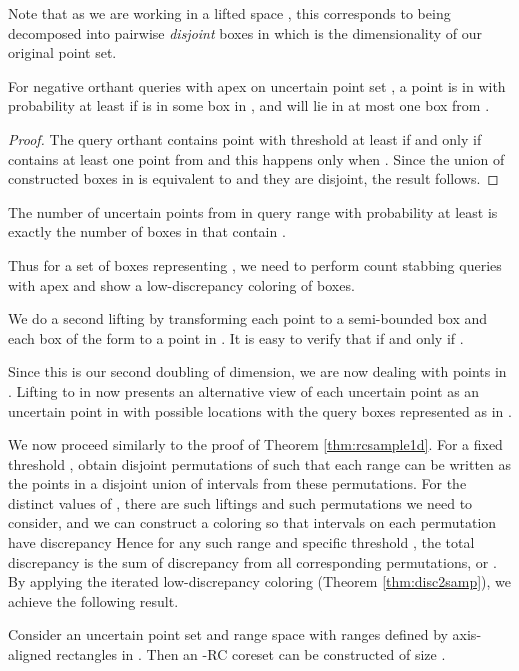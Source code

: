 \documentclass[11pt]{myclass}
\newcommand{\RC}{\textsf{RC}\xspace}
\begin{document}
Note that as we are working in a lifted space , this corresponds to  being decomposed into  pairwise \emph{disjoint} boxes in which  is the dimensionality of our original point set.

 
\begin{lemma}
For negative orthant queries  with apex  on uncertain point set , a point  is in  with probability at least  if  is in some box in , and  will lie in at most one box from .  
 \end{lemma}
\begin{proof}
The query orthant  contains point  with threshold at least  if and only if  contains at least one point from  and this happens only when . Since the union of constructed boxes in  is equivalent to  and they are disjoint, the result follows.
\end{proof} 
 
\begin{corollary}
The number of uncertain points from  in query range  with probability at least  is exactly the number of boxes in  that contain .  
 \end{corollary}
 
Thus for a set of boxes representing , we need to perform count stabbing queries with apex  and show a low-discrepancy coloring of boxes.  

We do a second lifting by transforming each point  to a semi-bounded box  and each box   of the form  to a point  in . It is easy to verify that  if and only if .

 
Since this is our second doubling of dimension, we are now dealing with points in . Lifting  to  in  now presents an alternative view of each uncertain point  as an uncertain point  in  with  possible locations with the query boxes represented as  in .

 We now proceed similarly to the proof of Theorem \ref{thm:rcsample1d}. For a fixed threshold , obtain  disjoint permutations of  such that each range  can be written as the points in a disjoint union of intervals from these permutations. 
 For the  distinct values of , there are  such liftings and  such permutations we need to consider, and we can construct a coloring  so that intervals on each permutation have discrepancy  
  Hence for any such range and specific threshold , the total discrepancy is the sum of discrepancy from all corresponding  permutations, or .  
By applying the iterated low-discrepancy coloring (Theorem \ref{thm:disc2samp}), we achieve the following result.

\begin{theorem}
\label{thm:RC-Rd}
Consider an uncertain point set  and range space  with ranges defined by axis-aligned rectangles in . 
Then an -\RC coreset can be constructed of size .
\end{theorem}
\end{document}
